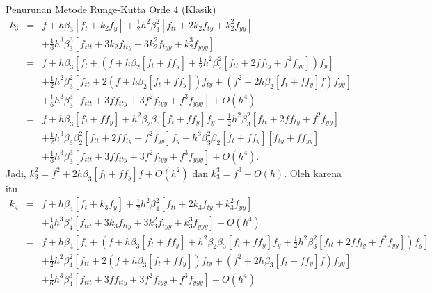 \begin{digression}{Penurunan Metode Runge-Kutta Orde 4 (Klasik)}
\noindent
\begin{eqnarray*}
k_{3} & = & f+h\beta_{3}\left[f_{t}+k_{2}f_{y}\right]+\frac{1}{2}h^{2}\beta_{3}^{2}\left[f_{tt}+2k_{2}f_{ty}+k_{2}^{2}f_{yy}\right]\\
 &  & +\frac{1}{6}h^{3}\beta_{3}^{3}\left[f_{ttt}+3k_{2}f_{tty}+3k_{2}^{2}f_{tyy}+k_{2}^{3}f_{yyy}\right]\\
 & = & f+h\beta_{3}\left[f_{t}+\left(f+h\beta_{2}\left[f_{t}+ff_{y}\right]+\frac{1}{2}h^{2}\beta_{2}^{2}\left[f_{tt}+2ff_{ty}+f^{2}f_{yy}\right]\right)f_{y}\right]\\
 &  & +\frac{1}{2}h^{2}\beta_{3}^{2}\left[f_{tt}+2\left(f+h\beta_{2}\left[f_{t}+ff_{y}\right]\right)f_{ty}+\left(f^{2}+2h\beta_{2}\left[f_{t}+ff_{y}\right]f\right)f_{yy}\right]\\
 &  & +\frac{1}{6}h^{3}\beta_{3}^{3}\left[f_{ttt}+3ff_{tty}+3f^{2}f_{tyy}+f^{3}f_{yyy}\right]+O(h^{4})\\
 & = & f+h\beta_{3}\left[f_{t}+ff_{y}\right]+h^{2}\beta_{2}\beta_{3}\left[f_{t}+ff_{y}\right]f_{y}+\frac{1}{2}h^{2}\beta_{3}^{2}\left[f_{tt}+2ff_{ty}+f^{2}f_{yy}\right]\\
 &  & +\frac{1}{2}h^{3}\beta_{3}\beta_{2}^{2}\left[f_{tt}+2ff_{ty}+f^{2}f_{yy}\right]f_{y}+h^{3}\beta_{3}^{2}\beta_{2}\left[f_{t}+ff_{y}\right]\left[f_{ty}+ff_{yy}\right]\\
 &  & +\frac{1}{6}h^{3}\beta_{3}^{3}\left[f_{ttt}+3ff_{tty}+3f^{2}f_{tyy}+f^{3}f_{yyy}\right]+O(h^{4}).
\end{eqnarray*}
Jadi, $k_{3}^{2}=f^{2}+2h\beta_{3}\left[f_{t}+ff_{y}\right]f+O(h^{2})$
dan $k_{3}^{3}=f^{3}+O(h)$. Oleh karena itu
\begin{eqnarray*}
k_{4} & = & f+h\beta_{4}\left[f_{t}+k_{3}f_{y}\right]+\frac{1}{2}h^{2}\beta_{4}^{2}\left[f_{tt}+2k_{3}f_{ty}+k_{3}^{2}f_{yy}\right]\\
 &  & +\frac{1}{6}h^{3}\beta_{4}^{3}\left[f_{ttt}+3k_{3}f_{tty}+3k_{3}^{2}f_{tyy}+k_{3}^{3}f_{yyy}\right]+O(h^{4})\\
 & = & f+h\beta_{4}\left[f_{t}+\left(f+h\beta_{3}\left[f_{t}+ff_{y}\right]+h^{2}\beta_{2}\beta_{3}\left[f_{t}+ff_{y}\right]f_{y}+\frac{1}{2}h^{2}\beta_{3}^{2}\left[f_{tt}+2ff_{ty}+f^{2}f_{yy}\right]\right)f_{y}\right]\\
 &  & +\frac{1}{2}h^{2}\beta_{4}^{2}\left[f_{tt}+2\left(f+h\beta_{3}\left[f_{t}+ff_{y}\right]\right)f_{ty}+\left(f^{2}+2h\beta_{3}\left[f_{t}+ff_{y}\right]f\right)f_{yy}\right]\\
 &  & +\frac{1}{6}h^{3}\beta_{4}^{3}\left[f_{ttt}+3ff_{tty}+3f^{2}f_{tyy}+f^{3}f_{yyy}\right]+O(h^{4})\\

\end{eqnarray*}
\end{digression}
